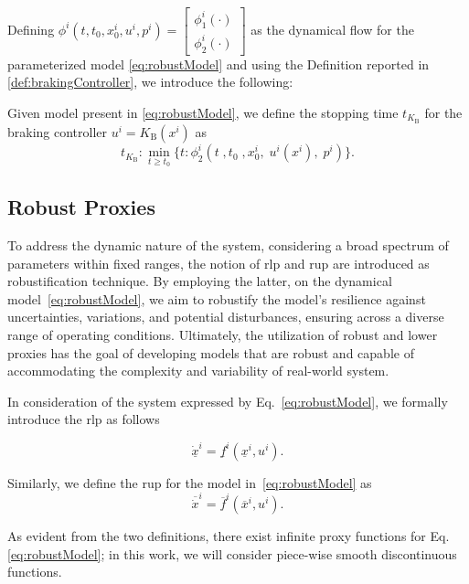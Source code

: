 Defining $\phi^i(t,t_0,x_0^i,u^i,p^i)= \left [\begin{array}{c}
	\phi^i_1\left(\cdot \right) \\
	\phi^i_2\left(\cdot \right)
\end{array}\right ]$ as the dynamical flow for the parameterized model \eqref{eq:robustModel} and using the Definition reported in \ref{def:brakingController}, we introduce the following:

\begin{definition} \label{def:stoppingTime}
	Given model present in \eqref{eq:robustModel}, we define the stopping time $t_{K_\mathrm{B}}$ for the braking controller  $u^i= K_\mathrm{B}(x^i)$ as
	\begin{equation*}
		t_{K_\mathrm{B}}: \underset{t \geq t_0}{\min}\{ t: \phi_2^i(t \;,t_0 \;,x_0^i, \;u^i(x^i), \;p^i)\}.
	\end{equation*}
\end{definition}




\subsection{Robust Proxies}
\label{subsec:robustProxies}

To address the dynamic nature of the system, considering a broad spectrum of parameters within fixed ranges, the notion of \gls{rlp} and \gls{rup} are introduced as robustification technique. By employing the latter, on the dynamical model~\eqref{eq:robustModel}, we aim to robustify the model's resilience against uncertainties, variations, and potential disturbances, ensuring across a diverse range of operating conditions. Ultimately, the utilization of robust and lower proxies has the goal of developing models that are robust and capable of accommodating the complexity and variability of real-world system.

\begin{definition}
	In consideration of the system expressed by Eq.~\eqref{eq:robustModel}, we formally introduce the \gls{rlp} as follows
	
	\begin{equation} \label{eq:rlp}
		\underline{\dot{x}}^i = \underline{f}^i(\underline{x}^i,u^i).
	\end{equation}
\end{definition}

\begin{definition}
	Similarly, we define the \gls{rup} for the model in~\eqref{eq:robustModel} as 
	\begin{equation} \label{eq:rup}
		\overline{\dot{x}}^i = \overline{f}^i(\overline{x}^i,u^i).
	\end{equation}
\end{definition}
As evident from the two definitions, there exist infinite proxy functions for Eq. \eqref{eq:robustModel}; in this work, we will consider piece-wise smooth discontinuous functions.

